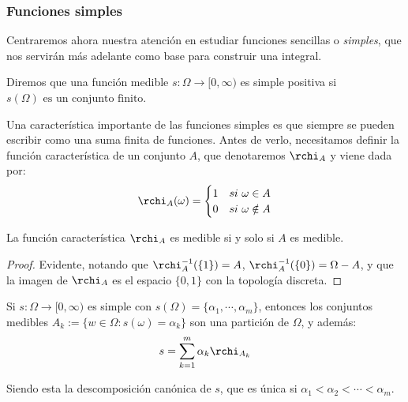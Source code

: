 
\subsubsection{Funciones simples}

Centraremos ahora nuestra atención en estudiar funciones sencillas o \textit{simples}, que nos servirán más adelante como base para construir una integral.

\begin{ndef}
  Diremos que una función medible $s: \Omega \to [0,\infty)$ es simple positiva si
  $s(\Omega) \text{ es un conjunto finito}$.
\end{ndef}

Una característica importante de las funciones simples es que siempre se pueden escribir como una suma finita de funciones. Antes de verlo, necesitamos definir la función característica de un conjunto $A$, que denotaremos $\rchi_A$ y viene dada por:
\[
  \rchi_A(\omega)= \begin{cases}
    1 & si \ \omega \in A\\
    0 & si \ \omega \notin A
  \end{cases}
\]

\begin{nprop} \label{chi} La función característica $\rchi_A$ es medible si y solo si $A$ es medible.
\end{nprop}

\begin{proof}
	Evidente, notando que $\rchi^{-1}_A(\{1\}) = A$, $\rchi^{-1}_A(\{0\}) = \Omega - A$, y que la imagen de $\rchi_A$ es el espacio $\{0,1\}$ con la topología discreta.
\end{proof}

\begin{nprop}
  Si $s:\Omega \to [0,\infty)$ es simple con \mbox{$s(\Omega) =  \{\alpha_1,\cdots, \alpha_m\}$}, entonces los conjuntos medibles $A_k:= \{w \in \Omega: s(\omega)= \alpha_k\}$ son una partición de $\Omega$, y además:
  \[
    s = \sum_{k=1}^m \alpha_k \rchi_{A_k}
  \]

  Siendo esta la descomposición canónica de $s$, que es única si $\alpha_1 < \alpha_2 <  \cdots <\alpha_m$.
\end{nprop}

